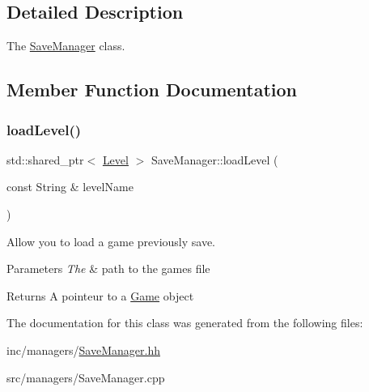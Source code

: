 \subsection{Detailed Description}
The \hyperlink{classSaveManager}{Save\+Manager} class. 

\subsection{Member Function Documentation}
\mbox{\label{classSaveManager_aa0661d6a8f9c0330755a8e03f8631992}} 
\subsubsection{\texorpdfstring{load\+Level()}{loadLevel()}}
{\footnotesize\ttfamily std\+::shared\+\_\+ptr$<$ \hyperlink{classLevel}{Level} $>$ Save\+Manager\+::load\+Level (\begin{DoxyParamCaption}\item[{const String \&}]{level\+Name }\end{DoxyParamCaption})}



Allow you to load a game previously save. 


\begin{DoxyParams}{Parameters}
{\em The} & path to the game\textquotesingle{}s file \\
\hline
\end{DoxyParams}
\begin{DoxyReturn}{Returns}
A pointeur to a \hyperlink{classGame}{Game} object 
\end{DoxyReturn}


The documentation for this class was generated from the following files\+:\begin{DoxyCompactItemize}
\item 
inc/managers/\hyperlink{SaveManager_8hh}{Save\+Manager.\+hh}\item 
src/managers/Save\+Manager.\+cpp\end{DoxyCompactItemize}
